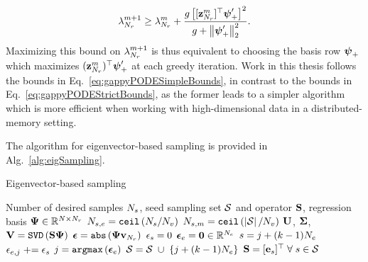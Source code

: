 \begin{enumerate}
	\begin{equation}\label{eq:gappyPODESimpleBounds}
		\lambda_{N_r}^{m+1} \ge \lambda_{N_r}^{m} + \frac{g \left[ [\mathbf{z}_{N_r}^{m}]^\top \boldsymbol{\psi}'_+ \right]^2}{g + \left\Vert \boldsymbol{\psi}'_+ \right\Vert_2^2}.
	\end{equation}
	Maximizing this bound on $\lambda_{N_r}^{m+1}$ is thus equivalent to choosing the basis row $\boldsymbol{\psi}_+$ which maximizes $(\mathbf{z}_{N_r}^{m})^\top \boldsymbol{\psi}'_+$ at each greedy iteration. Work in this thesis follows the bounds in Eq.~\ref{eq:gappyPODESimpleBounds}, in contrast to the bounds in Eq.~\ref{eq:gappyPODEStrictBounds}, as the former leads to a simpler algorithm which is more efficient when working with high-dimensional data in a distributed-memory setting.

	The algorithm for eigenvector-based sampling is provided in Alg.~\ref{alg:eigSampling}.

	\begin{algorithm}
		\caption{Eigenvector-based sampling}\label{alg:eigSampling}
		\begin{algorithmic}
			\REQUIRE Number of desired samples $N_s$, seed sampling set $\mathcal{S}$ and operator $\mathbf{S}$, regression basis $\deimBasis \inRTwo{\numDOF}{\numResModes}$
			\STATE $N_{s,e} = \mathtt{ceil}\left(N_s / N_{v} \right)$
			\STATE $N_{s,m} = \mathtt{ceil} \left( \left\vert \mathcal{S} \right\vert / N_{v} \right)$
				\STATE $\leftEvecMat$, $\boldsymbol{\Sigma}$, $\rightEvecMat = \mathtt{SVD}\left(\sampMat \deimBasis \right)$
				\STATE $\errVec = \mathtt{abs} \left( \deimBasis \rightEvecVec{\numResModes} \right)$
				\FORALL{$\sampIdx \in \sampSet$}
					\STATE $\epsilon_{s} = 0$ 
				\ENDFOR
				\STATE $\boldsymbol{\epsilon}_{e} = \mathbf{0} \in \mathbb{R}^{N_{e}}$
						\STATE $s = j + (k - 1) N_{e}$
						\STATE $\epsilon_{e,j} \mathrel{+}= \epsilon_{s}$ 
					\ENDFOR
				\ENDFOR
				\STATE $j = \mathtt{argmax} \left(\boldsymbol{\epsilon}_{e} \right)$
					\STATE $\mathcal{S} = \mathcal{S} \; \cup \; \{j + (k - 1) N_{e}\} $ 
				\ENDFOR
				\STATE $\mathbf{S} = [\mathbf{e}_{s}]^\top \; \forall \; s \in \mathcal{S}$
			\ENDFOR
		\end{algorithmic}
	\end{algorithm}


\end{enumerate}
